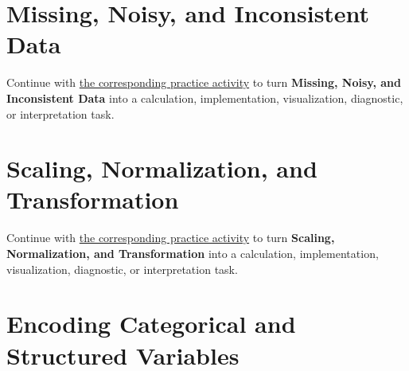 \documentclass[
  letterpaper,
]{scrbook}
\begin{document}
\section{Missing, Noisy, and Inconsistent
Data}\label{missing-noisy-and-inconsistent-data}

\begin{tcolorbox}[enhanced jigsaw, arc=.35mm, bottomrule=.15mm, bottomtitle=1mm, breakable, colback=white, colbacktitle=quarto-callout-tip-color!10!white, colframe=quarto-callout-tip-color-frame, coltitle=black, left=2mm, leftrule=.75mm, opacityback=0, opacitybacktitle=0.6, rightrule=.15mm, title=\textcolor{quarto-callout-tip-color}{\faLightbulb}\hspace{0.5em}{Put it into practice}, titlerule=0mm, toprule=.15mm, toptitle=1mm]

Continue with
\hyperref[sec-pr-06-missing-noisy-and-inconsistent-data]{the
corresponding practice activity} to turn \textbf{Missing, Noisy, and
Inconsistent Data} into a calculation, implementation, visualization,
diagnostic, or interpretation task.

\end{tcolorbox}

\section{Scaling, Normalization, and
Transformation}\label{scaling-normalization-and-transformation}

\begin{tcolorbox}[enhanced jigsaw, arc=.35mm, bottomrule=.15mm, bottomtitle=1mm, breakable, colback=white, colbacktitle=quarto-callout-tip-color!10!white, colframe=quarto-callout-tip-color-frame, coltitle=black, left=2mm, leftrule=.75mm, opacityback=0, opacitybacktitle=0.6, rightrule=.15mm, title=\textcolor{quarto-callout-tip-color}{\faLightbulb}\hspace{0.5em}{Put it into practice}, titlerule=0mm, toprule=.15mm, toptitle=1mm]

Continue with
\hyperref[sec-pr-06-scaling-normalization-and-transformation]{the
corresponding practice activity} to turn \textbf{Scaling, Normalization,
and Transformation} into a calculation, implementation, visualization,
diagnostic, or interpretation task.

\end{tcolorbox}

\section{Encoding Categorical and Structured
Variables}\label{encoding-categorical-and-structured-variables}
\end{document}
